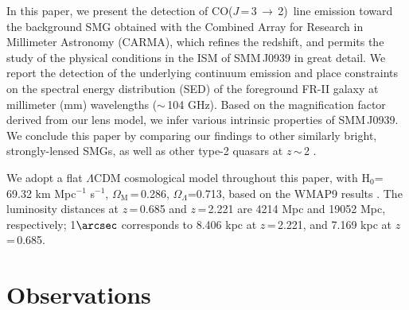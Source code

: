 \documentclass[twocolumn,apj,numberedappendix]{emulateapj}
\newcommand{\CO}{\mbox{CO($J$\,=\,3\,$\rightarrow$\,2) }}
\newcommand{\pmOne}{\mbox{$^{-1}$}}
\begin{document}
In this paper, we present the detection of \CO line emission toward the background SMG obtained with the Combined
Array for Research in Millimeter Astronomy (CARMA), which refines the redshift, and permits the study of the physical conditions in the ISM of SMM\,J0939 in great detail. We report the detection of the underlying continuum emission and place constraints on the spectral energy distribution (SED) of the foreground FR-II galaxy at millimeter (mm) wavelengths ($\sim$\,104 GHz). Based on the magnification factor derived from our lens model, we infer various intrinsic properties of SMM\,J0939. We 
conclude this paper by comparing our findings to other similarly bright, strongly-lensed SMGs, as well as other type-2 quasars at $z$\,$\sim$\,2 .

We adopt a flat $\Lambda$CDM cosmological model throughout this paper, with H$_0$= 69.32 km\,\,Mpc\pmOne\,\,s\pmOne, $\Omega_\textrm{M}$\,=\,0.286, $\Omega_\Lambda$=0.713, based on the WMAP9 results \citep{Hinshaw13a}.
The luminosity distances at $z$\,=\,0.685 and $z$\,=\,2.221 are 4214 Mpc and 19052 Mpc, respectively; 1$\arcsec$
corresponds to 8.406 kpc at $z$\,=\,2.221, and 7.169 kpc at $z$\,=\,0.685.

\section{Observations}\label{sec:obs}
\end{document}

